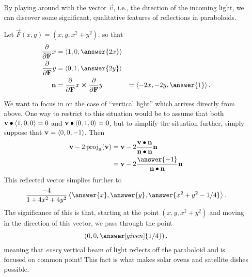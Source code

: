 \documentclass{ximera}
\begin{document}
\begin{example}
  By playing around with the vector $\vec{v}$, i.e., the direction of
  the incoming light, we can discover some significant, qualitative
  features of reflections in paraboloids.

  Let $\vec{F}(x,y) = (x,y,x^2 + y^2)$, so that
  \begin{align*}
    \pp{\vec{F}}{x} &= \vector{ 1, 0, \answer{2x}} \\
    \pp{\vec{F}}{y} &= \vector{0, 1, \answer{2y}} \\
    \vec{n} &= \pp{\vec{F}}{x} \cross \pp{\vec{F}}{y} &= \vector{-2x, -2y, \answer{1}}. \\
  \end{align*}

  We want to focus in on the case of ``vertical light'' which arrives directly from above.  One way to 
  restrict to this situation would be to assume that both $\mathbf{v} \bullet \langle 1, 0, 0 \rangle = 0$ and
  $\mathbf{v} \bullet \left\langle  0, 1, 0 \right\rangle = 0$, but to simplify the situation further, simply suppose
  that $\mathbf{v} = \left\langle  0, 0, -1 \right\rangle$.  Then
  \begin{align*}
    \vec{v} - 2 \proj_{\vec{n}} (\vec{v}) 
    &= \vec{v} - 2 \frac{\vec{v} \dotp \vec{n}}{\vec{n} \dotp \vec{n}} \vec{n} \\
    &= \vec{v} - 2 \frac{\answer{-1}}{\vec{n} \dotp \vec{n}} \vec{n} \\
  \end{align*}
  This reflected vector simplies further to
  \[
    \frac{-4}{1 + 4x^2 + 4y^2} \vector{\answer{x}, \answer{y}, \answer{x^2 + y^2 - 1/4}}.
  \]
  The significance of this is that, starting at the point
  $(x,y,x^2 + y^2)$ and moving in the direction of this vector, we pass through the point 
  \[
    \left( 0, 0, \answer[given]{1/4} \right),
  \]
  meaning that \textit{every} vertical beam of light reflects off the
  paraboloid and is focused on common point!  This fact is what makes
  solar ovens and satellite dishes possible.
  
\end{example}
\end{document}
